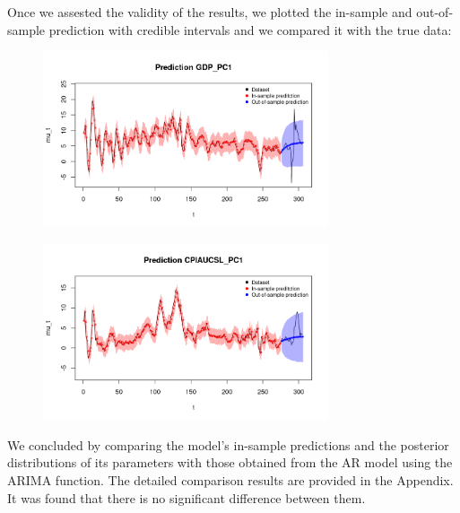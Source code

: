 Once we assested the validity of the results, we plotted the in-sample and out-of-sample prediction with credible intervals and we compared it with the true data: \\
\begin{figure}[h]
    \centering
    \includegraphics[width=0.75\textwidth]{images/2-AR/gdp_prediction.png}
    \label{fig:first}
\end{figure}
\begin{figure}[h]
    \centering
    \includegraphics[width=0.75\textwidth]{images/2-AR/infl_prediction.png}
    \label{fig:second}
\end{figure}
We concluded by comparing the model's in-sample predictions and the posterior distributions of its parameters with those obtained from the AR model using the ARIMA function. The detailed comparison results are provided in the Appendix. It was found that there is no significant difference between them.